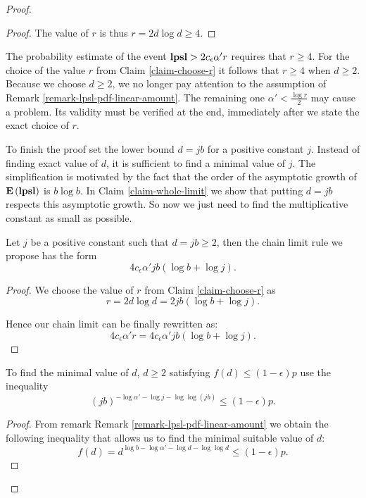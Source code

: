 \begin{proof}
\begin{proof}
The value of $r$ is thus $r = 2d \log d \geq 4$.
\end{proof}

The probability estimate of the event $\mathbf{lpsl} > 2 c_\epsilon \alpha' r$ requires that $r \geq 4$. For the choice of the value $r$ from Claim \ref{claim-choose-r} it follows that $r \geq 4$ when $d \geq 2$. Because we choose $d \geq 2$, we no longer pay attention to the assumption of Remark \ref{remark-lpsl-pdf-linear-amount}. The remaining one $\alpha' < \frac{\log r}{2}$ may cause a problem. Its validity must be verified at the end, immediately after we state the exact choice of $r$.

To finish the proof set the lower bound $d = j b$ for a positive constant $j$. Instead of finding exact value of $d$, it is sufficient to find a minimal value of $j$. The simplification is motivated by the fact that the order of the asymptotic growth of $\mathbf{E}\left(\mathbf{lpsl}\right)$ is $b \log b$. In Claim \ref{claim-whole-limit} we show that putting $d = jb$ respects this asymptotic growth. So now we just need to find the multiplicative constant as small as possible. 

\begin{claim}
\label{claim-whole-limit}
Let $j$ be a positive constant such that $d = jb \geq 2 $, then the chain limit rule we propose has the form \[ 4 c_\epsilon \alpha' j b (\log b + \log j) \text{.} \]
\end{claim}
\begin{proof}
We choose the value of $r$ from Claim \ref{claim-choose-r} as
\[
	r = 2 d \log d = 2 j b (\log b + \log j) \text{.}
\]

Hence our chain limit can be finally rewritten as:
\[
	4 c_\epsilon \alpha' r = 4 c_\epsilon \alpha' j b (\log b + \log j) \text{.}
\]
\end{proof}

\begin{claim}
To find the minimal value of $d$, $d \geq 2$ satisfying $f(d) \leq (1 - \epsilon) p$ use the inequality
\begin{equation}
\label{inequality-formula-j}
	\left(j b\right)^{-\log \alpha' -\log j - \log \log (j b)} \leq (1 - \epsilon)p \text{.}
\end{equation}
\end{claim}
\begin{proof}
From remark Remark \ref{remark-lpsl-pdf-linear-amount} we obtain the following inequality that allows us to find the minimal suitable value of $d$:
\[
	f(d) = d ^ {\log b - \log \alpha' - \log d - \log \log d} \leq (1 - \epsilon) p \text{.}
\]


\end{proof}
\end{proof}
